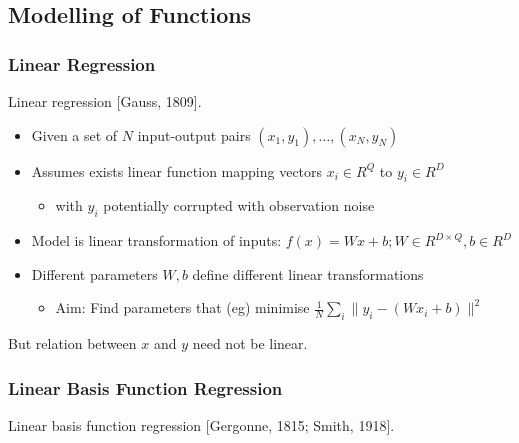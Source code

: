 \documentclass{article}
\newcommand{\norm}[1]{\lVert#1\rVert}
\begin{document}
\subsection{Modelling of Functions}

\subsubsection{Linear Regression}

Linear regression [Gauss, 1809].

\begin{itemize}
    \item Given a set of $N$ input-output pairs ${(x_1,y_1),\dots,(x_N,y_N)}$
    \item Assumes exists linear function mapping vectors $x_i \in R^Q$ to $y_i \in R^D$
    \begin{itemize}
        \item with $y_i$ potentially corrupted with observation noise
    \end{itemize}
    \item Model is linear transformation of inputs: $f(x) = Wx + b; W \in R^{D \times Q}, b \in R^D$
    \item Different parameters $W,b$ define different linear transformations
    \begin{itemize}
        \item Aim: Find parameters that (eg) minimise $\frac{1}{N} \sum_i \norm{y_i - (Wx_i + b)}^2$
    \end{itemize}
\end{itemize}

But relation between $x$ and $y$ need not be linear.

\subsubsection{Linear Basis Function Regression}

Linear basis function regression [Gergonne, 1815; Smith, 1918].
\end{document}
